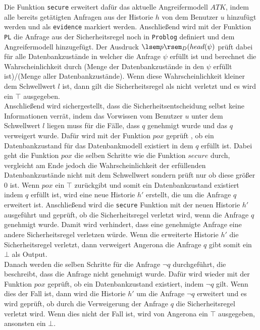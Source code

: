 \documentclass[german,version-2020-11]{uzl-thesis}
\begin{document}
Die Funktion \texttt{secure} erweitert dafür das aktuelle Angreifermodell $ATK$, indem alle bereits getätigten Anfragen aus der Historie $h$ von dem Benutzer $u$ hinzufügt werden und als \texttt{evidence} markiert werden. Anschließend wird mit der Funktion \texttt{PL} die Anfrage aus der Sicherheitsregel noch in \texttt{Problog} definiert und dem Angreifermodell hinzugefügt. Der Ausdruck $\lsem p \rsem_D (head(\psi)$ prüft dabei für alle Datenbankzustände in welcher die Anfrage $\psi$ erfüllt ist und berechnet die Wahrscheinlichkeit durch (Menge der Datenbankzustände in den $\psi$ erfüllt ist)/(Menge aller Datenbankzustände). Wenn diese Wahrscheinlichkeit kleiner dem Schwellwert $l$ ist, dann gilt die Sicherheitsregel als nicht verletzt und es wird ein $\top$ ausgegeben. \\ 
Anschließend wird sichergestellt, dass die Sicherheitsentscheidung selbst keine Informationen verrät, indem das Vorwissen vom Benutzer $u$ unter dem Schwellwert $l$ liegen muss für die Fälle, dass $q$ genehmigt wurde und das $q$ verweigert wurde. Dafür wird mit der Funktion $pox$ geprüft , ob ein Datenbankzustand für das Datenbankmodell existiert in dem $q$ erfüllt ist. Dabei geht die Funktion $pox$ die selben Schritte wie die Funktion $secure$ durch, vergleicht am Ende jedoch die Wahrscheinlichkeit der erfüllenden Datenbankzustände nicht mit dem Schwellwert sondern prüft nur ob diese größer 0 ist. Wenn $pox$ ein $\top$ zurückgibt und somit ein Datenbankzustand existiert indem $q$ erfüllt ist, wird eine neue Historie $h'$ erstellt, die um die Anfrage $q$ erweitert ist. Anschließend wird die \texttt{secure} Funktion mit der neuen Historie $h'$ ausgeführt und geprüft, ob die Sicherheitsregel verletzt wird, wenn die Anfrage $q$ genehmigt wurde. Damit wird verhindert, dass eine genehmigte Anfrage eine andere Sicherheitsregel verletzen würde. Wenn die erweiterte Historie $h'$ die Sicherheitsregel verletzt, dann verweigert Angerona die Anfrage $q$ gibt somit ein $\bot$ als Output. \\ 
Danach werden die selben Schritte für die Anfrage $\neg q$ durchgeführt, die beschreibt, dass die Anfrage nicht genehmigt wurde. Dafür wird wieder mit der Funktion $pox$ geprüft, ob ein Datenbankzustand existiert, indem $ \neg q$ gilt. Wenn dies der Fall ist, dann wird die Historie $h'$ um die Anfrage $\neg q$ erweitert und es wird geprüft, ob durch die Verweigerung der Anfrage $q$ die Sicherheitsregel verletzt wird. Wenn dies nicht der Fall ist, wird von Angerona ein $\top$ ausgegeben, ansonsten ein $\bot$. \\ \\ 
\end{document}
